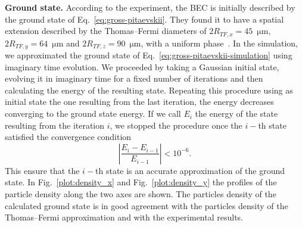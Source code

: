 \noindent \textbf{Ground state.} According to the experiment, the BEC is initially described by the ground state  of Eq.~\eqref{eq:gross-pitaevskii}. They found it to have a spatial extension described by the Thomas--Fermi diameters of $2R_{TF, x} = 45$~$\mathrm{\mu m}$, $2R_{TF, y} = 64 $~$ \mathrm{\mu m}$ and $2R_{TF, z} = 90 $~$ \mathrm{\mu m}$, with a uniform phase~\citep{DGPS99}.
In the simulation, we approximated the ground state of Eq.~\eqref{eq:gross-pitaevskii-simulation} using imaginary time evolution. We proceeded by taking a Gaussian initial state, evolving it in imaginary time for a fixed number of iterations and then calculating the energy of the resulting state. Repeating this procedure using as initial state the one resulting from the last iteration, the energy decreases converging to the ground state energy. If we call $E_i$ the energy of the state resulting from the iteration $i$, we stopped the procedure once the $i-$th state satisfied the convergence condition
\begin{equation}
\left| \frac{E_{i} - E_{i-1}}{E_{i-1}} \right| < 10^{-6}.
\end{equation}
This ensure that the $i-$th state is an accurate approximation of the ground state. In Fig.~\ref{plot:density_x} and Fig.~\ref{plot:density_y} the profiles of the particle density along the two axes are shown. The particles density of the calculated ground state is in good agreement with the particles density of the Thomas--Fermi approximation and with the experimental results.
